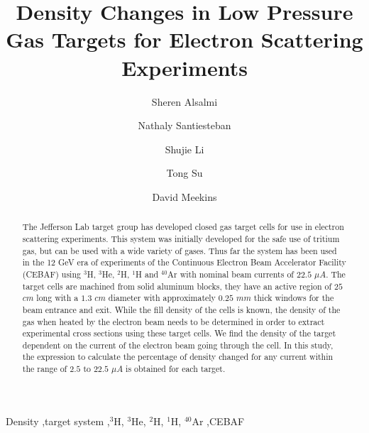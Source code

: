 \documentclass[final,5p,times,twocolumn,balance]{elsarticle}
\begin{document}
\begin{frontmatter}



\title{Density Changes in Low Pressure Gas Targets for Electron Scattering Experiments}

\author[Kent]{Sheren Alsalmi}
\author[UNH]{Nathaly Santiesteban}
\author[UNH]{Shujie Li}
\author[Kent]{Tong Su}
\author[JLab]{David Meekins}

\address[Kent]{Kent State University, Kent, OH 44240}
\address[UNH]{University of New Hampshire, Durham, NH 03824}
\address[JLab]{Jefferson Lab, Newport News, VA 23601}

\begin{abstract}
The Jefferson Lab target group has developed closed gas target cells for use in electron scattering experiments. This system was initially developed for the safe use of tritium gas, but can be used with a wide variety of gases.  Thus far the system has been used in the 12 GeV 
era of experiments of the Continuous Electron Beam Accelerator Facility (CEBAF) using $^{3}$H, $^{3}$He, $^{2}$H, $^{1}$H and $^{40}$Ar with nominal beam currents of  $22.5$ $\mu A$.  The target cells are machined from solid  aluminum blocks, they have an active region of $25$ $cm$ long with a $1.3$ $cm$ diameter with approximately $0.25$ $mm$ thick windows for the beam entrance and exit.   While the fill density of the cells is known, the density of the gas when heated by the electron beam needs to be determined in order to extract experimental cross sections using these target cells. We find the density of the target dependent on the current of the electron beam going through the cell. In this study, the expression to calculate the percentage of density changed for any current within the range of $2.5$ to $22.5$ $\mu A$ is obtained for each target.
 


  
\end{abstract}

\begin{keyword}
Density \sep target system
\sep $^{3}$H, $^{3}$He, $^{2}$H, $^{1}$H, $^{40}$Ar
\sep CEBAF
\end{keyword}
\end{frontmatter}
\end{document}
